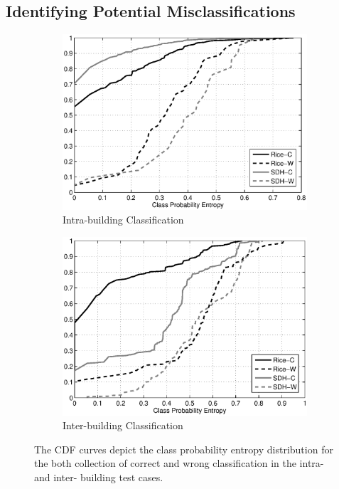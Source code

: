 \subsection{Identifying Potential Misclassifications}
\begin{figure}[ht!]
\centering
	\begin{subfigure}{0.48\textwidth}
                \centering
		\includegraphics[width=\textwidth]{./fig/cdf_intra.eps}
                \caption{Intra-building Classification}
                \label{fig:cdf_intra}
	\end{subfigure}
	\begin{subfigure}{0.48\textwidth}
                \centering
		\includegraphics[width=\textwidth]{./fig/cdf_inter.eps}
                \caption{Inter-building Classification}
                \label{fig:cdf_inter}
	\end{subfigure}
\caption{The CDF curves depict the class probability entropy distribution for the both collection of correct and wrong classification in the intra- and inter- building test cases.}
\label{fig:cdf}
\end{figure}

